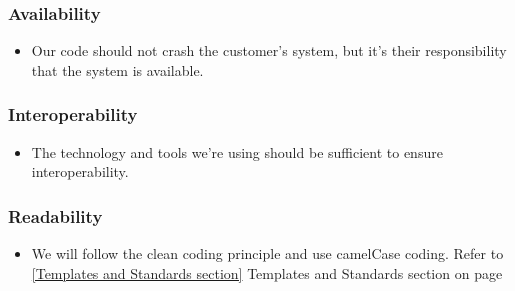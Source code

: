 \subsubsection{Availability}
\begin{itemize}
\item Our code should not crash the customer's system, but it's their responsibility that the system is available.
\end{itemize}

\subsubsection{Interoperability}
\begin{itemize}
\item The technology and tools we're using should be sufficient to ensure interoperability.
\end{itemize}

\subsubsection{Readability}
\begin{itemize}
\item We will follow the clean coding principle and use camelCase coding. Refer to \ref{Templates and Standards section} Templates and Standards section on page \pageref{Templates and Standards section}
\end{itemize}

